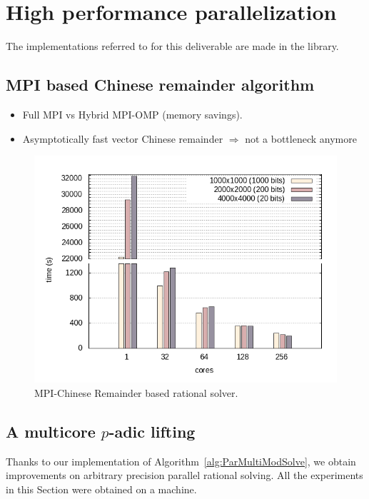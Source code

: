 \section{High performance parallelization}

The implementations referred to for this deliverable are made in the \Linbox library.


\subsection{MPI based Chinese remainder algorithm}

\begin{itemize}
\item  Full MPI vs Hybrid MPI-OMP (memory savings).
\item Asymptotically fast vector Chinese remainder $\Rightarrow$ not a bottleneck anymore
\end{itemize}



\begin{figure}[htb]
\begin{center}
  \includegraphics[width=.8\textwidth]{nodes_histogram}
\end{center}
\caption{MPI-Chinese Remainder based rational solver.}\label{fig:mpi_histo}
\end{figure}
\subsection{A multicore $p$-adic lifting}
Thanks to our implementation of Algorithm~\ref{alg:ParMultiModSolve}, 
we obtain improvements on arbitrary precision parallel rational
solving.
All the experiments in this Section were obtained on a 
machine.

